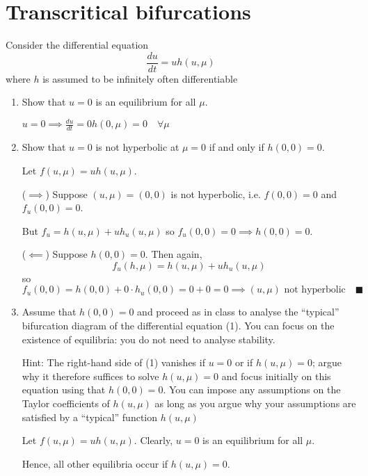 \documentclass[12pt]{article}
\newcommand{\qed}{\quad \blacksquare}
\begin{document}
\pagebreak

\section{Transcritical bifurcations}
Consider the differential equation
\[\frac{du}{dt} = uh(u, \mu) \tag{1}\]
where $h$ is assumed to be infinitely often differentiable
\begin{enumerate}
    \item Show that $u = 0$ is an equilibrium for all $\mu$.

          \color{blue}
          $u = 0 \implies \frac{du}{dt} = 0 h(0, \mu) = 0 \quad \forall \mu$
          \color{black}

    \item Show that $u = 0$ is not hyperbolic at $\mu = 0$ if and only if $h(0, 0) = 0$.

          \color{blue}
          Let $f(u, \mu) = uh(u, \mu)$.

          ($\implies$) Suppose $(u, \mu) = (0, 0)$ is not hyperbolic, i.e. $f(0, 0) = 0$ and $f_u(0, 0) = 0$.

          But $f_u = h(u, \mu) + uh_u(u, \mu)$ so $f_u(0, 0) = 0 \implies h(0, 0) = 0$.

          ($\impliedby$) Suppose $h(0, 0) = 0$. Then again,
          \[f_u(h, \mu) = h(u, \mu) + uh_u(u, \mu)\]
          so
          \[f_u(0, 0) = h(0, 0) + 0\cdot h_u(0, 0) = 0 + 0 = 0 \implies (u, \mu) \text{ not hyperbolic} \qed\]

          \color{black}

    \item Assume that $h(0, 0) = 0$ and proceed as in class to analyse the ``typical'' bifurcation diagram of the differential equation (1). You can focus on the existence of equilibria: you do not need to analyse stability.

          Hint: The right-hand side of (1) vanishes if $u = 0$ or if $h(u, \mu) = 0$; argue why it therefore suffices to solve $h(u, \mu) = 0$ and focus initially on this equation using that $h(0, 0) = 0$. You can impose any assumptions on the Taylor coefficients of $h(u, \mu)$ as long as you argue why your assumptions are satisfied by a ``typical'' function $h(u, \mu)$

          \color{blue}
          Let $f(u, \mu) = uh(u, \mu)$. Clearly, $u = 0$ is an equilibrium for all $\mu$.

          Hence, all other equilibria occur if $h(u, \mu) = 0$.


\end{enumerate}
\end{document}

